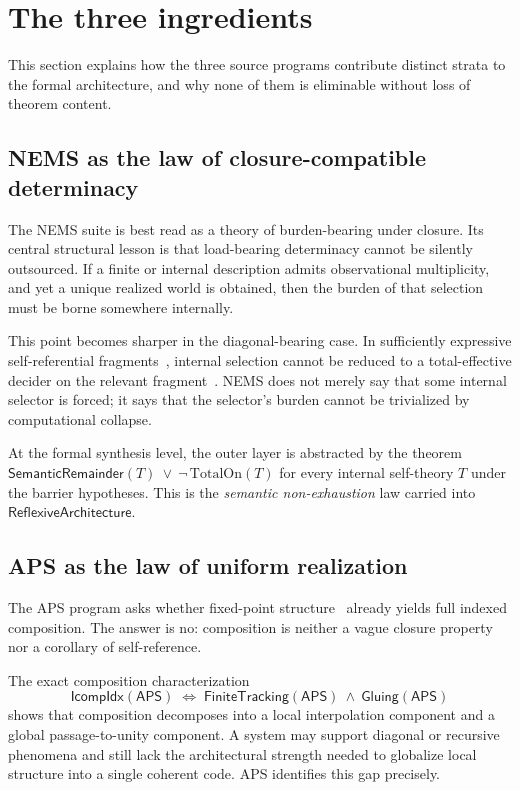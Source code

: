 \documentclass[11pt]{article}
\newcommand{\APS}{\ensuremath{\mathsf{APS}}}
\newcommand{\FinTrack}{\ensuremath{\mathsf{FiniteTracking}}}
\newcommand{\Glue}{\ensuremath{\mathsf{Gluing}}}
\newcommand{\Comp}{\ensuremath{\mathsf{IcompIdx}}}
\newcommand{\SemRem}{\ensuremath{\mathsf{SemanticRemainder}}}
\newcommand{\RAL}{\ensuremath{\mathsf{ReflexiveArchitecture}}}
\begin{document}
\section{The three ingredients}
\label{sec:ingredients}

This section explains how the three source programs contribute distinct strata to the
formal architecture, and why none of them is eliminable without loss of theorem content.

\subsection{NEMS as the law of closure-compatible determinacy}

The NEMS suite \cite{SpivackNEMS01-2026,SpivackNEMS08-2026,SpivackNEMS11-2026,
SpivackNEMS81-2026} is best read as a theory of burden-bearing under closure.  Its
central structural lesson is that load-bearing determinacy cannot be silently outsourced.
If a finite or internal description admits observational multiplicity, and yet a unique
realized world is obtained, then the burden of that selection must be borne somewhere
internally.

This point becomes sharper in the diagonal-bearing case.  In sufficiently expressive
self-referential fragments~\cite{Turing1936,Godel1931}, internal selection cannot be
reduced to a total-effective decider on the relevant fragment~\cite{SpivackNEMS11-2026,Rice1953}.
NEMS does not merely say that some internal selector is forced; it says that the
selector's burden cannot be trivialized by computational collapse.

At the formal synthesis level, the outer layer is abstracted by the theorem
\(
\SemRem(T)\ \lor\ \neg\, \mathrm{TotalOn}(T)
\)
for every internal self-theory $T$ under the barrier hypotheses.  This is the
\emph{semantic non-exhaustion} law carried into $\RAL$.

\subsection{APS as the law of uniform realization}

The APS program \cite{SpivackAPS2026} asks whether fixed-point structure~\cite{Kleene1952}
already yields full indexed composition.  The answer is no: composition is neither a vague closure
property nor a corollary of self-reference.

The exact composition characterization
\[
\Comp(\APS)
\;\Longleftrightarrow\;
\FinTrack(\APS)\ \wedge\ \Glue(\APS)
\]
shows that composition decomposes into a local interpolation component and a global
passage-to-unity component.  A system may support diagonal or recursive phenomena and
still lack the architectural strength needed to globalize local structure into a single
coherent code.  APS identifies this gap precisely.
\end{document}
